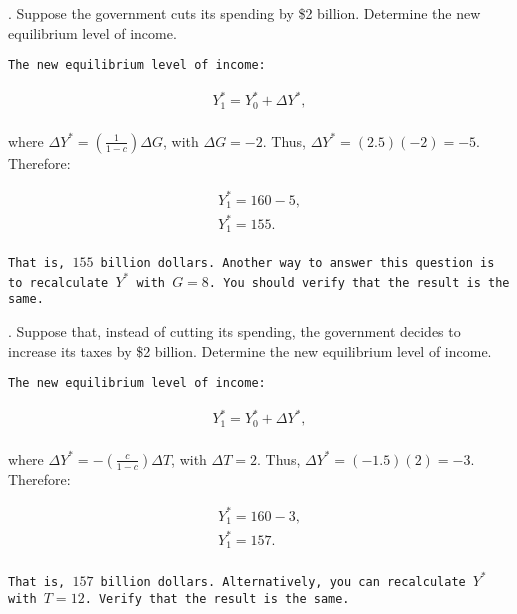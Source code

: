 \documentclass[12pt]{article}
\begin{document}
. Suppose the government cuts its spending by \$2 billion.  Determine the new equilibrium level of income. 

\vspace{10pt}


\texttt{The new equilibrium level of income:}

\begin{eqnarray}
Y^*_1 = Y^*_0 + \Delta Y^*, \nonumber \\
\end{eqnarray}

\noindent where $\Delta Y^* =  \left( \frac{1}{1 - c} \right) \Delta G$, with $\Delta G = -2$.  Thus, $\Delta Y^* = \left( 2.5 \right) (-2) = -5$.  Therefore:

\begin{eqnarray}
Y^*_1 = 160 - 5, \nonumber \\
Y^*_1 = 155. \nonumber \\
\end{eqnarray}

\texttt{That is, $155$ billion dollars. Another way to answer this question is to recalculate $Y^*$ with $G = 8$.  You should verify that the result is the same.
}

\vspace{12pt}


. Suppose that, instead of cutting its spending, the government decides to increase its taxes by \$2 billion.  Determine the new equilibrium level of income. 

\vspace{10pt}

\texttt{The new equilibrium level of income:}

\begin{eqnarray}
Y^*_1 = Y^*_0 + \Delta Y^*, \nonumber \\
\end{eqnarray}

\noindent where $\Delta Y^* =  - \left( \frac{c}{1 - c} \right) \Delta T$, with $\Delta T = 2$.  Thus, $\Delta Y^* = \left( - 1.5 \right) (2) = -3$.  Therefore:

\begin{eqnarray}
Y^*_1 = 160 - 3, \nonumber \\
Y^*_1 = 157. \nonumber \\
\end{eqnarray}

\texttt{That is, $157$ billion dollars.  Alternatively, you can recalculate $Y^*$ with $T = 12$.  Verify that the result is the same.}
\end{document}

